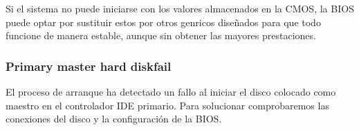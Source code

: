 		Si el sistema no puede iniciarse con los valores almacenados en la
		CMOS, la BIOS puede optar por sustituir estos por otros genricos
		diseñados para que todo funcione de manera estable, aunque sin
		obtener las mayores prestaciones. 

		\subsubsection{Primary master hard diskfail}

		El proceso de arranque ha detectado un fallo al iniciar el disco
		colocado como maestro en el controlador IDE primario. Para
		solucionar comprobaremos las conexiones del disco y la
		configuración de la BIOS. 
	

	\newpage
	\newpage
